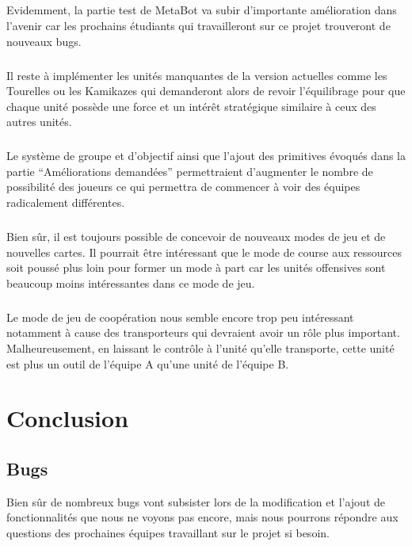 \documentclass{report}
\begin{document}
\paragraph{}
  Evidemment, la partie test de MetaBot va subir d’importante amélioration dans l’avenir car les prochains étudiants qui travailleront sur ce projet trouveront de nouveaux bugs.
\paragraph{}
Il reste à implémenter les unités manquantes de la version actuelles comme les Tourelles ou les Kamikazes qui demanderont alors de revoir l’équilibrage pour que chaque unité possède une force et un intérêt stratégique similaire à ceux des autres unités.
\paragraph{}
 Le système de groupe et d’objectif ainsi que l’ajout des primitives évoqués dans la partie “Améliorations demandées” permettraient d’augmenter le nombre de possibilité des joueurs ce qui permettra de commencer à voir des équipes radicalement différentes.
\paragraph{}
Bien sûr, il est toujours possible de concevoir de nouveaux modes de jeu et de nouvelles cartes. Il pourrait être intéressant que le mode de course aux ressources soit poussé plus loin pour former un mode à part car les unités offensives sont beaucoup moins intéressantes dans ce mode de jeu.
\paragraph{}
Le mode de jeu de coopération nous semble encore trop peu intéressant notamment à cause des transporteurs qui devraient avoir un rôle plus important. Malheureusement, en laissant le contrôle à l'unité qu'elle transporte, cette unité est plus un outil de l'équipe A qu'une unité de l'équipe B.


\chapter{Conclusion}
\section{Bugs}
Bien sûr de nombreux bugs vont subsister lors de la modification et l’ajout de fonctionnalités que nous ne voyons pas encore, mais nous pourrons répondre aux questions des prochaines équipes travaillant sur le projet si besoin.
\end{document}
